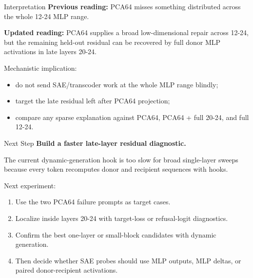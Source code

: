 \documentclass[aspectratio=169]{beamer}
\begin{document}
\begin{frame}{Interpretation}
  \textbf{Previous reading:} PCA64 misses something distributed across the whole
  12-24 MLP range.

  \vspace{0.25cm}
  \textbf{Updated reading:} PCA64 supplies a broad low-dimensional repair across
  12-24, but the remaining held-out residual can be recovered by full donor MLP
  activations in late layers 20-24.

  \vspace{0.25cm}
  Mechanistic implication:
  \begin{itemize}
    \item do not send SAE/transcoder work at the whole MLP range blindly;
    \item target the late residual left after PCA64 projection;
    \item compare any sparse explanation against PCA64, PCA64 + full 20-24, and full 12-24.
  \end{itemize}
\end{frame}

\begin{frame}{Next Step}
  \textbf{Build a faster late-layer residual diagnostic.}

  \vspace{0.2cm}
  The current dynamic-generation hook is too slow for broad single-layer sweeps
  because every token recomputes donor and recipient sequences with hooks.

  \vspace{0.25cm}
  Next experiment:
  \begin{enumerate}
    \item Use the two PCA64 failure prompts as target cases.
    \item Localize inside layers 20-24 with target-loss or refusal-logit diagnostics.
    \item Confirm the best one-layer or small-block candidates with dynamic generation.
    \item Then decide whether SAE probes should use MLP outputs, MLP deltas, or paired donor-recipient activations.
  \end{enumerate}
\end{frame}
\end{document}
